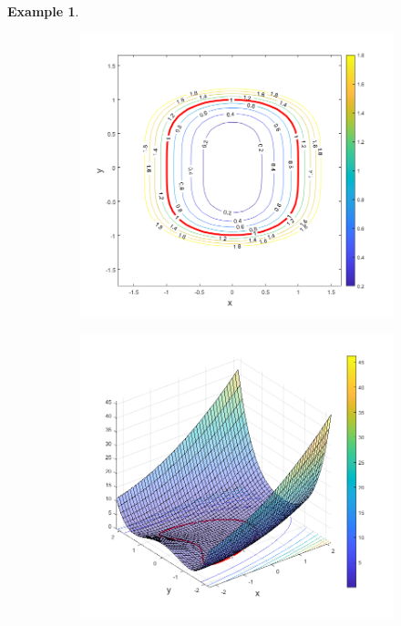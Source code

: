 \documentclass[11pt]{article}
\newtheorem{example}{Example}
\theoremstyle{remark}
\begin{document}
\begin{example}
\begin{figure}[!htb]
\begin{subfigure}{0.5\textwidth}
    \includegraphics[scale=0.45]{non_convex_SP_levelsets.png}
    \end{subfigure}%
    \hspace{-20pt}
    \begin{subfigure}{0.5\textwidth}
    \centering
    \includegraphics[scale=0.45]{non_convex_S.png}
    \vspace{-10pt}

\end{subfigure}
\end{figure}
\end{example}
\end{document}
